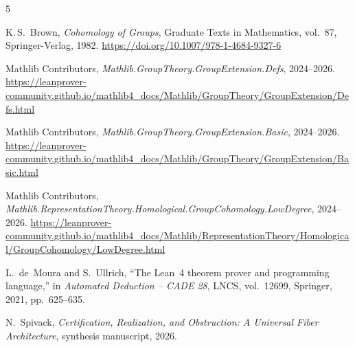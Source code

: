 \documentclass[11pt]{article}
\begin{document}
\begin{thebibliography}{5}

K.\,S.~Brown,
\emph{Cohomology of Groups},
Graduate Texts in Mathematics, vol.~87,
Springer-Verlag, 1982.
\newblock \url{https://doi.org/10.1007/978-1-4684-9327-6}

Mathlib Contributors,
\emph{Mathlib.GroupTheory.GroupExtension.Defs},
2024--2026.
\newblock \url{https://leanprover-community.github.io/mathlib4_docs/Mathlib/GroupTheory/GroupExtension/Defs.html}

Mathlib Contributors,
\emph{Mathlib.GroupTheory.GroupExtension.Basic},
2024--2026.
\newblock \url{https://leanprover-community.github.io/mathlib4_docs/Mathlib/GroupTheory/GroupExtension/Basic.html}

Mathlib Contributors,
\emph{Mathlib.RepresentationTheory.Homological.GroupCohomology.LowDegree},
2024--2026.
\newblock \url{https://leanprover-community.github.io/mathlib4_docs/Mathlib/RepresentationTheory/Homological/GroupCohomology/LowDegree.html}

L.~de~Moura and S.~Ullrich,
``The Lean~4 theorem prover and programming language,''
in \emph{Automated Deduction -- CADE 28}, LNCS, vol.~12699,
Springer, 2021, pp.~625--635.

N.~Spivack,
\emph{Certification, Realization, and Obstruction: A Universal Fiber Architecture},
synthesis manuscript, 2026.

\end{thebibliography}
\end{document}
